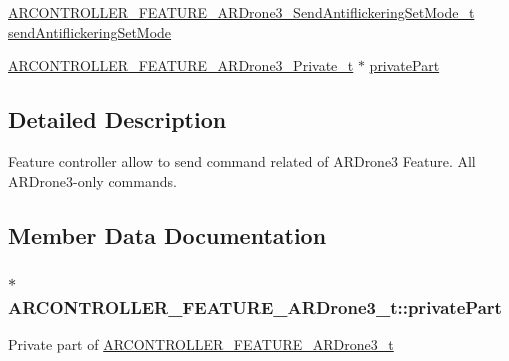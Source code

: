 \begin{DoxyCompactItemize}
\item 
\hyperlink{_a_r_c_o_n_t_r_o_l_l_e_r___feature_8h_a538ab2a71be2988a3861b48a0ad4392c}{A\+R\+C\+O\+N\+T\+R\+O\+L\+L\+E\+R\+\_\+\+F\+E\+A\+T\+U\+R\+E\+\_\+\+A\+R\+Drone3\+\_\+\+Send\+Antiflickering\+Set\+Mode\+\_\+t} \hyperlink{struct_a_r_c_o_n_t_r_o_l_l_e_r___f_e_a_t_u_r_e___a_r_drone3__t_a09c31639fc88c532085fc2298a4a6e87}{send\+Antiflickering\+Set\+Mode}
\item 
\hyperlink{_a_r_c_o_n_t_r_o_l_l_e_r___feature_8h_add124c16b65d4fa714306a5394205a1c}{A\+R\+C\+O\+N\+T\+R\+O\+L\+L\+E\+R\+\_\+\+F\+E\+A\+T\+U\+R\+E\+\_\+\+A\+R\+Drone3\+\_\+\+Private\+\_\+t} $\ast$ \hyperlink{struct_a_r_c_o_n_t_r_o_l_l_e_r___f_e_a_t_u_r_e___a_r_drone3__t_aefa2243cb53df4207efbce112054d7c1}{private\+Part}
\end{DoxyCompactItemize}


\subsection{Detailed Description}
Feature controller allow to send command related of A\+R\+Drone3 Feature. All A\+R\+Drone3-\/only commands. 

\subsection{Member Data Documentation}
\subsubsection[{\texorpdfstring{private\+Part}{privatePart}}]{$\ast$ A\+R\+C\+O\+N\+T\+R\+O\+L\+L\+E\+R\+\_\+\+F\+E\+A\+T\+U\+R\+E\+\_\+\+A\+R\+Drone3\+\_\+t\+::private\+Part}\hypertarget{struct_a_r_c_o_n_t_r_o_l_l_e_r___f_e_a_t_u_r_e___a_r_drone3__t_aefa2243cb53df4207efbce112054d7c1}{}\label{struct_a_r_c_o_n_t_r_o_l_l_e_r___f_e_a_t_u_r_e___a_r_drone3__t_aefa2243cb53df4207efbce112054d7c1}
Private part of \hyperlink{struct_a_r_c_o_n_t_r_o_l_l_e_r___f_e_a_t_u_r_e___a_r_drone3__t}{A\+R\+C\+O\+N\+T\+R\+O\+L\+L\+E\+R\+\_\+\+F\+E\+A\+T\+U\+R\+E\+\_\+\+A\+R\+Drone3\+\_\+t} 
